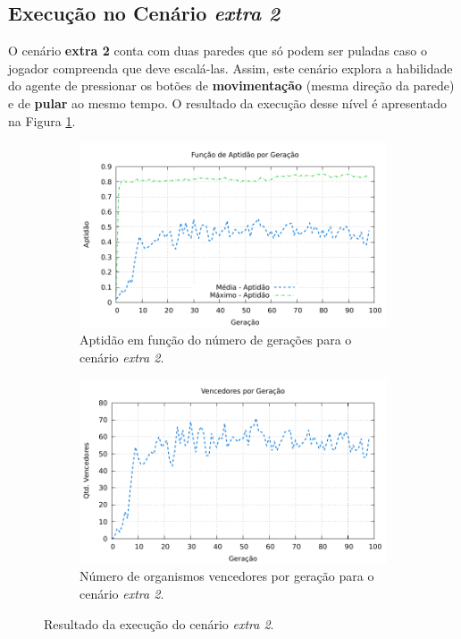 \subsection{\label{section:experiment-extra2}Execução no Cenário \textit{extra
2}}

O cenário \textbf{extra 2} conta com duas paredes que só podem ser puladas caso
o jogador compreenda que deve escalá-las. Assim, este cenário explora a
habilidade do agente de pressionar os botões de \textbf{movimentação} (mesma
direção da parede) e de \textbf{pular} ao mesmo tempo. O resultado da execução
desse nível é apresentado na Figura \ref{fig:extra2-results}.

\begin{figure}[H]
\centering
	\begin{subfigure}[b]{0.45\textwidth}
        \includegraphics[width=\textwidth]{fig/extra2-fitness.pdf}
        \caption{Aptidão em função do número de gerações para o cenário
        \textit{extra 2}.}
	\end{subfigure}
	\begin{subfigure}[b]{0.45\textwidth}
        \includegraphics[width=\textwidth]{fig/extra2-winners.pdf}
        \caption{Número de organismos vencedores por geração para o cenário
        \textit{extra 2}.}
	\end{subfigure}

    \caption{Resultado da execução do cenário \textit{extra 2}.}
	\label{fig:extra2-results}
\end{figure}


